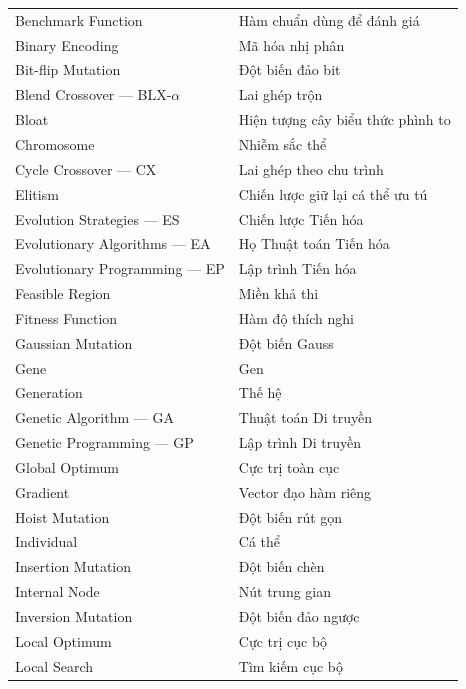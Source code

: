 \begin{longtable}{p{7.1cm}p{7.1cm}}
Benchmark Function                  & Hàm chuẩn dùng để đánh giá \\
Binary Encoding                     & Mã hóa nhị phân \\
Bit-flip Mutation                   & Đột biến đảo bit \\
Blend Crossover --- BLX-$\alpha$    & Lai ghép trộn \\
Bloat                               & Hiện tượng cây biểu thức phình to \\
Chromosome                          & Nhiễm sắc thể \\
Cycle Crossover --- CX              & Lai ghép theo chu trình \\
Elitism                             & Chiến lược giữ lại cá thể ưu tú \\
Evolution Strategies --- ES         & Chiến lược Tiến hóa \\
Evolutionary Algorithms --- EA      & Họ Thuật toán Tiến hóa \\
Evolutionary Programming --- EP     & Lập trình Tiến hóa \\
Feasible Region                     & Miền khả thi \\
Fitness Function                    & Hàm độ thích nghi \\
Gaussian Mutation                   & Đột biến Gauss \\
Gene                                & Gen \\
Generation                          & Thế hệ \\
Genetic Algorithm --- GA            & Thuật toán Di truyền \\
Genetic Programming --- GP          & Lập trình Di truyền \\
Global Optimum                      & Cực trị toàn cục \\
Gradient                            & Vector đạo hàm riêng \\
Hoist Mutation                      & Đột biến rút gọn \\
Individual                          & Cá thể \\
Insertion Mutation                  & Đột biến chèn \\
Internal Node                       & Nút trung gian \\
Inversion Mutation                  & Đột biến đảo ngược \\
Local Optimum                       & Cực trị cục bộ \\
Local Search                        & Tìm kiếm cục bộ \\

\end{longtable}
